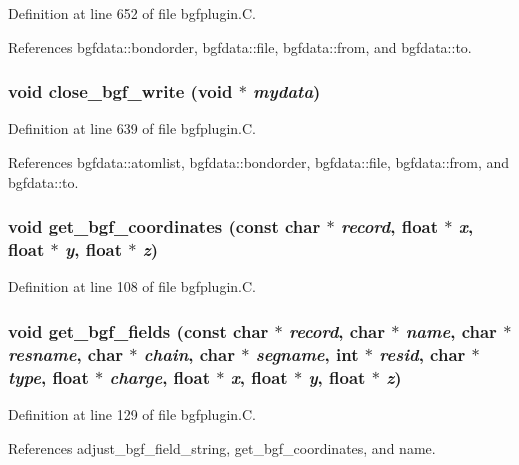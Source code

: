 Definition at line 652 of file bgfplugin.C.

References bgfdata::bondorder, bgfdata::file, bgfdata::from, and bgfdata::to.
\subsubsection{\setlength{\rightskip}{0pt plus 5cm}void close\_\-bgf\_\-write (void $\ast$ {\em mydata})\hspace{0.3cm}{\tt  [static]}}\label{bgfplugin_8C_a16}




Definition at line 639 of file bgfplugin.C.

References bgfdata::atomlist, bgfdata::bondorder, bgfdata::file, bgfdata::from, and bgfdata::to.
\subsubsection{\setlength{\rightskip}{0pt plus 5cm}void get\_\-bgf\_\-coordinates (const char $\ast$ {\em record}, float $\ast$ {\em x}, float $\ast$ {\em y}, float $\ast$ {\em z})\hspace{0.3cm}{\tt  [static]}}\label{bgfplugin_8C_a4}




Definition at line 108 of file bgfplugin.C.
\subsubsection{\setlength{\rightskip}{0pt plus 5cm}void get\_\-bgf\_\-fields (const char $\ast$ {\em record}, char $\ast$ {\em name}, char $\ast$ {\em resname}, char $\ast$ {\em chain}, char $\ast$ {\em segname}, int $\ast$ {\em resid}, char $\ast$ {\em type}, float $\ast$ {\em charge}, float $\ast$ {\em x}, float $\ast$ {\em y}, float $\ast$ {\em z})\hspace{0.3cm}{\tt  [static]}}\label{bgfplugin_8C_a5}




Definition at line 129 of file bgfplugin.C.

References adjust\_\-bgf\_\-field\_\-string, get\_\-bgf\_\-coordinates, and name.
